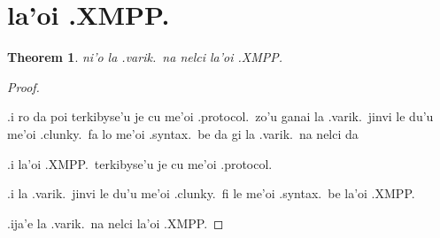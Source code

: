 \documentclass{article}
\newtheorem{thm}{Theorem}
\begin{document}
\section{la'oi .XMPP.}
\begin{thm}
	ni'o la .varik.\ na nelci la'oi .XMPP.
\end{thm}
\begin{proof}
	${}$

	.i ro da poi terkibyse'u je cu me'oi .protocol.\ zo'u ganai la .varik.\ jinvi le du'u me'oi .clunky.\ fa lo me'oi .syntax.\ be da gi la .varik.\ na nelci da

	.i la'oi .XMPP.\ terkibyse'u je cu me'oi .protocol.

	.i la .varik.\ jinvi le du'u me'oi .clunky.\ fi le me'oi .syntax.\ be la'oi .XMPP.

	.ija'e la .varik.\ na nelci la'oi .XMPP.
\end{proof}
\end{document}
